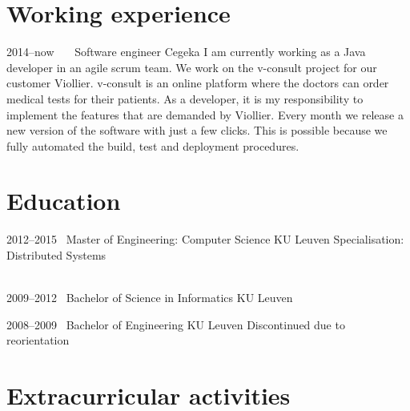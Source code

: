 \documentclass[a4paper]{friggeri-cv} %
\begin{document}
\section{Working experience}
\begin{entrylist}
\entry
{2014--now~~~}
{Software engineer}
{Cegeka}
{I am currently working as a Java developer in an agile scrum team. We work on the v-consult project for our customer Viollier. v-consult is an online platform where the doctors can order medical tests for their patients.
As a developer, it is my responsibility to implement the features that are demanded by Viollier. Every month we release a new version of the software with just a few clicks.
This is possible because we fully automated the build, test and deployment procedures.}

\end{entrylist}

\section{Education}

\begin{entrylist}
\entry
{2012--2015~}
{Master of Engineering: Computer Science}
{KU Leuven}
{Specialisation: Distributed Systems\\
~}


\entry
{2009--2012~}
{Bachelor of Science in Informatics}
{KU Leuven}
{~}

\entry
{2008--2009~}
{Bachelor of Engineering}
{KU Leuven}
{Discontinued due to reorientation}
\end{entrylist}



\section{Extracurricular activities}
\end{document}
